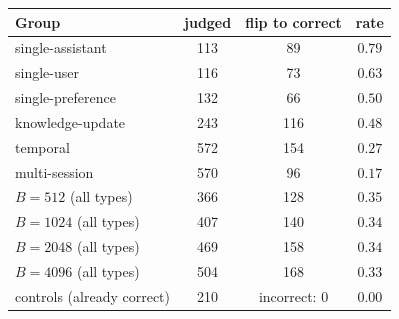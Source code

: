 \begin{tabular}{lccc}
\toprule
Group & judged & flip to correct & rate \\
\midrule
single-assistant & 113 & 89 & $0.79$ \\
single-user & 116 & 73 & $0.63$ \\
single-preference & 132 & 66 & $0.50$ \\
knowledge-update & 243 & 116 & $0.48$ \\
temporal & 572 & 154 & $0.27$ \\
multi-session & 570 & 96 & $0.17$ \\
\midrule
$B{=}512$ (all types) & 366 & 128 & $0.35$ \\
$B{=}1024$ (all types) & 407 & 140 & $0.34$ \\
$B{=}2048$ (all types) & 469 & 158 & $0.34$ \\
$B{=}4096$ (all types) & 504 & 168 & $0.33$ \\
controls (already correct) & 210 & incorrect: 0 & $0.00$ \\
\bottomrule
\end{tabular}
